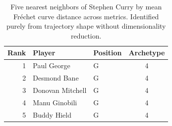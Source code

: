 \begin{table}[htbp]
  \centering\small
  \begin{tabular}{rllc}
    \toprule
    Rank & Player & Position & Archetype \\
    \midrule
    1 & Paul George & G & 4 \\
    2 & Desmond Bane & G & 4 \\
    3 & Donovan Mitchell & G & 4 \\
    4 & Manu Ginobili & G & 4 \\
    5 & Buddy Hield & G & 4 \\
    \bottomrule
  \end{tabular}
  \caption{Five nearest neighbors of Stephen Curry by mean Fr\'{e}chet curve distance across metrics. Identified purely from trajectory shape without dimensionality reduction.}
  \label{tab:Stephen_Curry_frechet_curve_neighbors}
\end{table}

